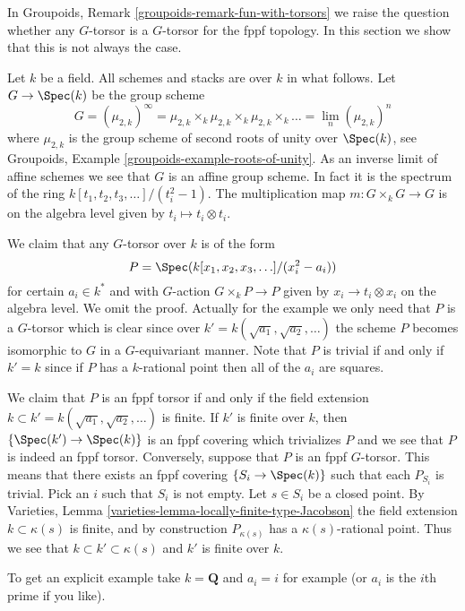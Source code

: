 \noindent
In
Groupoids, Remark \ref{groupoids-remark-fun-with-torsors}
we raise the question whether any $G$-torsor is a $G$-torsor for the
fppf topology. In this section we show that this is not always the case.

\medskip\noindent
Let $k$ be a field. All schemes and stacks are over $k$ in what follows.
Let $G \to \Spec(k)$ be the group scheme
$$
G = (\mu_{2, k})^\infty =
\mu_{2, k} \times_k \mu_{2, k} \times_k \mu_{2, k} \times_k \ldots =
\lim_n (\mu_{2, k})^n
$$
where $\mu_{2, k}$ is the group scheme of second roots of unity over
$\Spec(k)$, see
Groupoids, Example \ref{groupoids-example-roots-of-unity}.
As an inverse limit of affine schemes we see that $G$ is an affine group
scheme. In fact it is the spectrum of the ring
$k[t_1, t_2, t_3, \ldots]/(t_i^2 - 1)$. The multiplication map
$m : G \times_k G \to G$ is on the algebra level given by
$t_i \mapsto t_i \otimes t_i$.

\medskip\noindent
We claim that any $G$-torsor over $k$ is of the form
$$
P = \Spec(k[x_1, x_2, x_3, \ldots]/(x_i^2 - a_i))
$$
for certain $a_i \in k^*$ and with $G$-action $G \times_k P \to P$
given by $x_i \to t_i \otimes x_i$ on the algebra level.
We omit the proof.
Actually for the example we only need that $P$ is a $G$-torsor
which is clear since over $k' = k(\sqrt{a_1}, \sqrt{a_2}, \ldots)$
the scheme $P$ becomes isomorphic to $G$ in a $G$-equivariant manner.
Note that $P$ is trivial if and only if $k' = k$ since if
$P$ has a $k$-rational point then all of the $a_i$ are squares.

\medskip\noindent
We claim that $P$ is an fppf torsor if and only if the field extension
$k \subset k' = k(\sqrt{a_1}, \sqrt{a_2}, \ldots)$ is finite.
If $k'$ is finite over $k$, then
$\{\Spec(k') \to \Spec(k)\}$
is an fppf covering which trivializes $P$ and we see that $P$ is indeed
an fppf torsor. Conversely, suppose that $P$ is an fppf $G$-torsor.
This means that there exists an fppf covering
$\{S_i \to \Spec(k)\}$ such that each $P_{S_i}$ is trivial.
Pick an $i$ such that $S_i$ is not empty. Let $s \in S_i$ be a closed
point. By
Varieties, Lemma \ref{varieties-lemma-locally-finite-type-Jacobson}
the field extension $k \subset \kappa(s)$ is finite, and by construction
$P_{\kappa(s)}$ has a $\kappa(s)$-rational point. Thus we see that
$k \subset k' \subset \kappa(s)$ and $k'$ is finite over $k$.

\medskip\noindent
To get an explicit example take $k = \mathbf{Q}$ and $a_i = i$
for example (or $a_i$ is the $i$th prime if you like).

